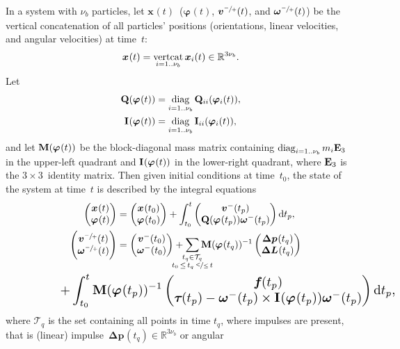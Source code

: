 \documentclass[global,twocolumn]{svjour}
\let\vec\bm
\newcommand{\mat}[1]{{\bf #1}}
\newcommand{\R}{\mathbb{R}}
\newcommand{\dvect}[2]{\ensuremath{\begin{pmatrix}#1\\#2\end{pmatrix}}}
\newcommand{\cross}{\times}
\newcommand{\pos}    [1]{\ensuremath{\vec{x}_{#1}}}
\newcommand{\orient} [1]{\ensuremath{\vec{\varphi}_{#1}}}
\newcommand{\linvel} [1]{\ensuremath{\vec{v}_{#1}}}
\newcommand{\angvel} [1]{\ensuremath{\vec{\omega}_{#1}}}
\newcommand{\mass}   [1]{\ensuremath{m_{#1}}}
\newcommand{\inertia}[1]{\ensuremath{\mat{I}_{#1}}}
\newcommand{\identmat}[1]{\ensuremath{\mat{E}_{#1}}}
\newcommand{\force}    [1]{\ensuremath{\vec{f}_{#1}}}
\newcommand{\torque}   [1]{\ensuremath{\vec{\tau}_{#1}}}
\newcommand{\linimp}   [1]{\ensuremath{\vec{\Delta p}_{#1}}}
\newcommand{\angimp}   [1]{\ensuremath{\vec{\Delta L}_{#1}}}
\newcommand{\tInt}{\ensuremath{t_p}}
\newcommand{\tImp}{\ensuremath{t_q}}
\newcommand{\diag}{\operatornamewithlimits{diag}}
\newcommand{\vertcat}{\operatornamewithlimits{vertcat}}
\newcommand{\numbodies}{\ensuremath{\nu_b}}
\newcommand*\diff{\mathop{}\!\mathrm{d}}
\newcommand{\twodots}{\ensuremath{\mathrel{\ldotp\ldotp}}}
\begin{document}
		In a system with \numbodies{} particles, let
		$\pos{}(t)$~($\orient{}(t)$, $\linvel{}^{\sfrac{-}{+}}(t)$, and $\angvel{}^{\sfrac{-}{+}}(t)$) be the
		vertical concatenation of all particles' positions (orientations, linear velocities, and angular velocities) at time~$t$:
		\begin{equation*}
			\pos{}(t) = \vertcat_{i=1\twodots\numbodies} \pos{i}(t) \in \R^{3\numbodies{}}.
		\end{equation*}
		Let
		\begin{equation*}
			\begin{split}
				\mat{Q}(\orient{}(t)) & = \diag_{i=1\twodots\numbodies} \mat{Q}_{ii}(\orient{i}(t)), \\
				\inertia{}(\orient{}(t)) & = \diag_{i=1\twodots\numbodies} \inertia{ii}(\orient{i}(t)),
			\end{split}
		\end{equation*}
		and let $\mat{M}(\orient{}(t))$ be the
		block-diagonal mass matrix containing
		$\diag_{i=1\twodots\numbodies} \mass{i} \identmat{3}$ in the upper-left
		quadrant and $\inertia{}(\orient{}(t))$ in the lower-right quadrant,
		where $\identmat{3}$ is the $3 \times 3$~identity matrix. Then given
		initial conditions at time~$t_0$, the state of the system at time~$t$
		is described by the integral equations
		\begin{alignat*}{2}
			&& \dvect{\pos{}(t)}{\orient{}(t)} & = \dvect{\pos{}(t_0)}{\orient{}(t_0)} + \int_{t_0}^t \dvect{\linvel{}^-(\tInt)}{\mat{Q}(\orient{}(\tInt)) \angvel{}^-(\tInt)} \diff \tInt, \\
			&& \dvect{\linvel{}^{\sfrac{-}{+}}(t)}{\angvel{}^{\sfrac{-}{+}}(t)} & = \dvect{\linvel{}^-(t_0)}{\angvel{}^-(t_0)}
			   + \sum_{\crampedclap{\substack{\tImp \in \mathcal{T}_q\\t_0\,\leq\,\tImp\,\nicefrac{<}{\leq}\,t}}} \mat{M}(\orient{}(\tImp))^{-1} \dvect{ \linimp{}(\tImp)}{\angimp{}(\tImp)} \\
			&\rlap{\resizebox{\linewidth}{!}{$\displaystyle + \int_{t_0}^t \mat{M}(\orient{}(\tInt))^{-1} \dvect{ \force{}(\tInt)}{\torque{}(\tInt) - \angvel{}^-(\tInt) \cross \inertia{}(\orient{}(\tInt)) \angvel{}^-(\tInt)} \diff \tInt,$}} &&
		\end{alignat*}
		where $\mathcal{T}_q$ is the set containing all points in time \tImp{},
		where impulses are present, that is (linear)
		impulse~$\linimp{}(\tImp{}) \in \R^{3\numbodies{}}$ or angular
\end{document}
